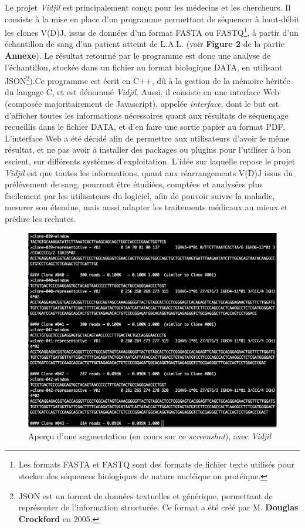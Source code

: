 \documentclass[pdftex,12pt,a4paper]{report}
\begin{document}
\begin{spacing}{1.2}
Le projet \textit{Vidjil} est principalement conçu pour les médecins et les chercheurs.
\newline 
Il consiste à la mise en place d'un programme permettant de séquencer à haut-débit les clones V(D)J, issus de données d'un format FASTA ou FASTQ\footnote{Les formats FASTA et FASTQ sont des formats de fichier texte utilisés pour stocker des séquences biologiques de nature nucléique ou protéique.}, à partir d'un échantillon de sang d'un patient atteint de L.A.L. (voir \textbf{Figure 2} de la partie \textbf{Annexe}). Le résultat retourné par le programme est donc une analyse de l'échantillon, stockée dans un fichier au format biologique DATA, en utilisant JSON\footnote{JSON est un format de données textuelles et générique, permettant de représenter de l'information structurée. Ce format a été créé par M. \textbf{Douglas Crockford} en 2005.}).Ce programme est écrit en C++, dû à la gestion de la mémoire héritée du langage C, et est dénommé \textit{Vidjil}. Aussi, il consiste en une interface Web (composée majoritairement de Javascript), appelée \textit{interface}, dont le but est d'afficher toutes les informations nécessaires quant aux résultats de séquençage recueillis dans le fichier DATA, et d'en faire une sortie papier au format PDF. L'interface Web a été décidé afin de permettre aux utilisateurs d'avoir le même résultat, et ne pas avoir à installer des packages ou plugins pour l'utiliser à bon escient, sur différents systèmes d'exploitation.
\newline
L'idée sur laquelle repose le projet \textit{Vidjil} est que toutes les informations, quant aux réarrangements V(D)J issus du prélévement de sang, pourront être étudiées, comptées et analysées plus facilement par les utilisateurs du logiciel, afin de pouvoir suivre la maladie, mesurer son étendue, mais aussi adapter les traitements médicaux au mieux et prédire les rechutes.

\begin{figure}[H]
\begin{center}
	\includegraphics[scale=0.6]{img/C++-Ex.jpg}
\end{center}
\caption{Aperçu d'une segmentation (en cours sur ce \textit{screenshot}), avec \textit{Vidjil}}
\end{figure}


\end{spacing}
\end{document}

